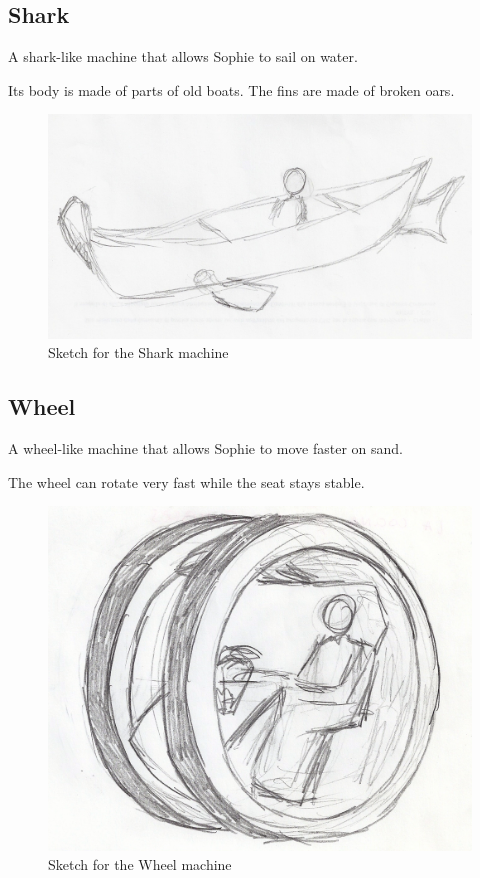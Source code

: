 \pagebreak

\subsection*{Shark}
A shark-like machine that allows Sophie to sail on water.

Its body is made of parts of old boats. The fins are made of broken oars.

\begin{figure}[H]
  \centering
  \includegraphics[width=14cm]{Images/Machines/shark}
  \caption{Sketch for the Shark machine}
\end{figure}

\pagebreak

\subsection*{Wheel}
A wheel-like machine that allows Sophie to move faster on sand.

The wheel can rotate very fast while the seat stays stable.

\begin{figure}[H]
  \centering
  \includegraphics[width=14cm]{Images/Machines/wheel}
  \caption{Sketch for the Wheel machine}
\end{figure}

